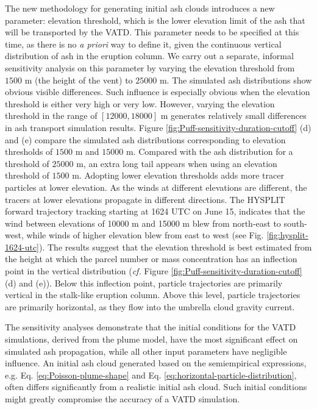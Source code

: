 \documentclass[utf8]{frontiersSCNS} %
\begin{document}
The new methodology for generating initial ash clouds introduces a new parameter: elevation threshold, which is the lower elevation limit of the ash that will be transported by the VATD.  This parameter needs to be specified at this time, as there is no {\it a priori} way to define it, given the continuous vertical distribution of ash in the eruption column. We carry out a separate, informal sensitivity analysis on this parameter by varying the elevation threshold from $1500 $ m (the height of the vent) to $25000 $ m. The simulated ash distributions show obvious visible differences. Such influence is especially obvious when the elevation threshold is either very high or very low. However, varying the elevation threshold in the range of $[12000, 18000] $ m generates relatively small differences in ash transport simulation results.  Figure \ref{fig:Puff-sensitivity-duration-cutoff} (d) and (e) compare the simulated ash distributions corresponding to elevation thresholds of $1500 $ m and $15000 $ m. Compared with the ash distribution for a threshold of $25000 $ m, an extra long tail appears when using an elevation threshold of $1500 $ m. Adopting lower elevation thresholds  adds more tracer particles at lower elevation. As the winds at different elevations are different, the tracers at lower elevations propagate in different directions. The HYSPLIT \citep{stein2015noaa, rolph2017real} forward trajectory tracking starting at 1624 UTC on June 15, indicates that the wind between elevations of 10000 m and 15000 m blew from north-east to south-west, while winds of higher elevation blew from east to west (see Fig. \ref{fig:hysplit-1624-utc}).  The results suggest that the elevation threshold is best estimated from the height at which the parcel number or mass concentration has an inflection point in the vertical distribution ({\it cf.} Figure \ref{fig:Puff-sensitivity-duration-cutoff}(d) and (e)).  Below this inflection point, particle trajectories are primarily vertical in the stalk-like eruption column.  Above this level, particle trajectories are primarily horizontal, as they flow into the umbrella cloud gravity current.   

The sensitivity analyses demonstrate that the initial conditions for the VATD simulations, derived from the plume model, have the most significant effect on simulated ash propagation, while all other input parameters have negligible influence. An initial ash cloud generated based on the semiempirical expressions, e.g. Eq. \ref{eq:Poisson-plume-shape} and Eq. \ref{eq:horizontal-particle-distribution}, often differs significantly from a realistic initial ash cloud. Such initial conditions might greatly compromise the accuracy of a VATD simulation.
\end{document}
